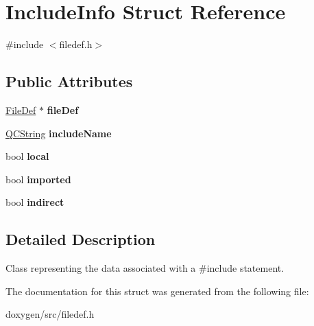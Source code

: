 \hypertarget{struct_include_info}{}\section{Include\+Info Struct Reference}
\label{struct_include_info}


{\ttfamily \#include $<$filedef.\+h$>$}

\subsection*{Public Attributes}
\begin{DoxyCompactItemize}
\item 
\mbox{\label{struct_include_info_a29386ee70ad3c80623571b7af55ed8f0}} 
\mbox{\hyperlink{class_file_def}{File\+Def}} $\ast$ {\bfseries file\+Def}
\item 
\mbox{\label{struct_include_info_a0f8b77f07d748ea1612db5d4c47c5c37}} 
\mbox{\hyperlink{class_q_c_string}{Q\+C\+String}} {\bfseries include\+Name}
\item 
\mbox{\label{struct_include_info_a1455653edfa732656ee4f77d72adae40}} 
bool {\bfseries local}
\item 
\mbox{\label{struct_include_info_a733eb5a7223f7619cfa7d5e390d5c224}} 
bool {\bfseries imported}
\item 
\mbox{\label{struct_include_info_a14646bcb52c3c65d8fc0093614334c8e}} 
bool {\bfseries indirect}
\end{DoxyCompactItemize}


\subsection{Detailed Description}
Class representing the data associated with a \#include statement. 

The documentation for this struct was generated from the following file\+:\begin{DoxyCompactItemize}
\item 
doxygen/src/filedef.\+h\end{DoxyCompactItemize}
